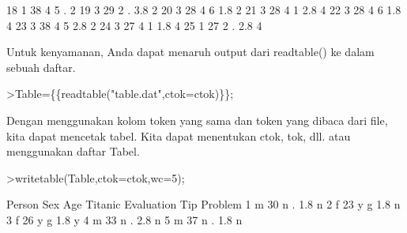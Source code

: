 \documentclass[a4paper,10pt]{article}
\begin{document}
\begin{eulernotebook}
\begin{eulercomment}
\begin{eulercomment}
\begin{eulercomment}
\begin{eulercomment}
\begin{eulercomment}
\begin{eulercomment}
\begin{eulercomment}
\begin{eulercomment}
\begin{eulercomment}
\begin{eulercomment}
\begin{eulercomment}
\begin{eulercomment}
\begin{eulercomment}
\begin{eulercomment}
\begin{eulercomment}
\begin{eulercomment}
\begin{eulercomment}
\begin{eulercomment}
\begin{eulercomment}
\begin{eulercomment}
\begin{eulercomment}
\begin{eulercomment}
\begin{eulercomment}
\begin{eulercomment}
\begin{eulercomment}
\begin{eulercomment}
\begin{eulercomment}
\begin{eulercomment}
\begin{eulercomment}
\begin{eulercomment}
\begin{eulercomment}
\begin{eulercomment}
\begin{eulercomment}
\begin{eulercomment}
\begin{eulercomment}
\begin{eulercomment}
\begin{eulercomment}
\begin{eulercomment}
\begin{eulercomment}
\begin{eulercomment}
\begin{eulercomment}
\begin{eulercomment}
\begin{eulercomment}
\begin{eulercomment}
\begin{euleroutput}
     18    1   38    4    5    .    2
     19    3   29    2    .  3.8    2
     20    3   28    4    6  1.8    2
     21    3   28    4    1  2.8    4
     22    3   28    4    6  1.8    4
     23    3   38    4    5  2.8    2
     24    3   27    4    1  1.8    4
     25    1   27    2    .  2.8    4
\end{euleroutput}
\begin{eulercomment}
Untuk kenyamanan, Anda dapat menaruh output dari readtable() ke dalam
sebuah daftar.
\end{eulercomment}
\begin{eulerprompt}
>Table=\{\{readtable("table.dat",ctok=ctok)\}\};
\end{eulerprompt}
\begin{eulercomment}
Dengan menggunakan kolom token yang sama dan token yang dibaca dari
file, kita dapat mencetak tabel. Kita dapat menentukan ctok, tok, dll.
atau menggunakan daftar Tabel.
\end{eulercomment}
\begin{eulerprompt}
>writetable(Table,ctok=ctok,wc=5);
\end{eulerprompt}
\begin{euleroutput}
   Person  Sex  Age Titanic Evaluation  Tip Problem
        1    m   30       n          .  1.8       n
        2    f   23       y          g  1.8       n
        3    f   26       y          g  1.8       y
        4    m   33       n          .  2.8       n
        5    m   37       n          .  1.8       n

\end{euleroutput}
\end{eulercomment}
\end{eulercomment}
\end{eulercomment}
\end{eulercomment}
\end{eulercomment}
\end{eulercomment}
\end{eulercomment}
\end{eulercomment}
\end{eulercomment}
\end{eulercomment}
\end{eulercomment}
\end{eulercomment}
\end{eulercomment}
\end{eulercomment}
\end{eulercomment}
\end{eulercomment}
\end{eulercomment}
\end{eulercomment}
\end{eulercomment}
\end{eulercomment}
\end{eulercomment}
\end{eulercomment}
\end{eulercomment}
\end{eulercomment}
\end{eulercomment}
\end{eulercomment}
\end{eulercomment}
\end{eulercomment}
\end{eulercomment}
\end{eulercomment}
\end{eulercomment}
\end{eulercomment}
\end{eulercomment}
\end{eulercomment}
\end{eulercomment}
\end{eulercomment}
\end{eulercomment}
\end{eulercomment}
\end{eulercomment}
\end{eulercomment}
\end{eulercomment}
\end{eulercomment}
\end{eulercomment}
\end{eulercomment}
\end{eulernotebook}
\end{document}
